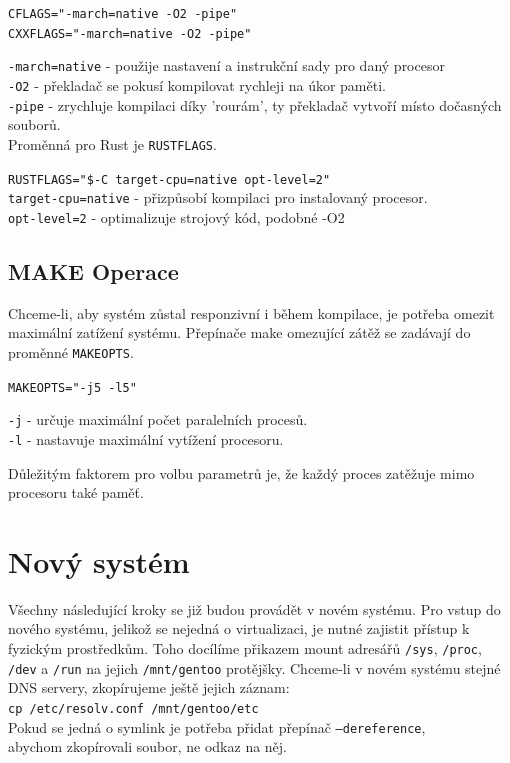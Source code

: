 \documentclass[12pt,a4paper,twoside,]{article}
\begin{document}
{\texttt{CFLAGS="-march=native -O2 -pipe"}\\
\texttt{CXXFLAGS="-march=native -O2 -pipe"}

\texttt{-march=native} - použije nastavení a instrukční sady pro daný procesor\\
\texttt{-O2} - překladač se pokusí kompilovat rychleji na úkor paměti.\\
\texttt{-pipe} - zrychluje kompilaci díky 'rourám', ty překladač vytvoří místo dočasných souborů.\\

Proměnná pro Rust je \texttt{RUSTFLAGS}.

\texttt{RUSTFLAGS="\$-C target-cpu=native opt-level=2"}\\

\texttt{target-cpu=native} - přizpůsobí kompilaci pro instalovaný procesor.\\
\texttt{opt-level=2} - optimalizuje strojový kód, podobné -O2      %

\subsection{\textsf{MAKE Operace}}
Chceme-li, aby systém zůstal responzivní i během kompilace, je potřeba omezit maximální zatížení systému.
Přepínače make omezující zátěž se zadávají do proměnné \texttt{MAKEOPTS}.

\texttt{MAKEOPTS="-j5 -l5"}

\hspace{-1.5em}\texttt{-j} - určuje maximální počet paralelních procesů.\\
\texttt{-l} - nastavuje maximální vytížení procesoru.

\hspace{-1.5em}Důležitým faktorem pro volbu parametrů je, že každý proces zatěžuje mimo procesoru také paměť.

\newpage
\section{\textsf{Nový systém}}
Všechny následující kroky se již budou provádět v novém systému.
Pro vstup do nového systému, jelikož se nejedná o virtualizaci, je nutné zajistit přístup k fyzickým prostředkům.
Toho docílíme přikazem mount adresářů \texttt{/sys}, \texttt{/proc}, \texttt{/dev} a \texttt{/run} na jejich \texttt{/mnt/gentoo} protějšky. Chceme-li v novém 
systému stejné DNS servery, zkopírujeme ještě jejich záznam: \\ \texttt{cp /etc/resolv.conf /mnt/gentoo/etc}\\ Pokud se jedná o symlink
je potřeba přidat přepínač  \texttt{--dereference}, 
\\abychom zkopírovali soubor, ne odkaz na něj. 
}
\end{document}
